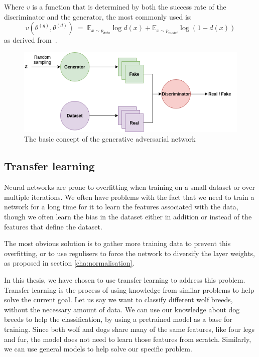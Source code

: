 Where $v$ is a function that is determined by both the success rate of the discriminator and the generator, the most commonly used is:
\begin{equation} 
    v(\theta^{(g)},\theta^{(d)}) \; = \; \mathds{E}_{x\sim p_{data}}\log{d(x)} + \mathds{E}_{x\sim p_{model}}\log{(1 - d(x))} 
\end{equation}
as derived from~\cite{Goodfellow:2014:GAN:2969033.2969125}.


\begin{figure}[ht!]
    \centering
    \includegraphics[scale=0.6]{background/figures/GAN.png}
    \caption{The basic concept of the generative adversarial network}
    \label{fig:GAN}
\end{figure}
    
\subsection{Transfer learning}
Neural networks are prone to overfitting when training on a small dataset or over multiple iterations. We often have problems with the fact that we need to train a network for a long time for it to learn the features associated with the data, though we often learn the bias in the dataset either in addition or instead of the features that define the dataset.

The most obvious solution is to gather more training data to prevent this overfitting, or to use regulisers to force the network to diversify the layer weights, as proposed in section \ref{cha:normalisation}.

In this thesis, we have chosen to use transfer learning to address this problem. Transfer learning is the process of using knowledge from similar problems to help solve the current goal.  Let us say we want to classify different wolf breeds, without the necessary amount of data. We can use our knowledge about dog breeds to help the classification, by using a pretrained model as a base for training. Since both wolf and dogs share many of the same features, like four legs and fur, the model does not need to learn those features from scratch.
Similarly, we can use general models to help solve our specific problem.



